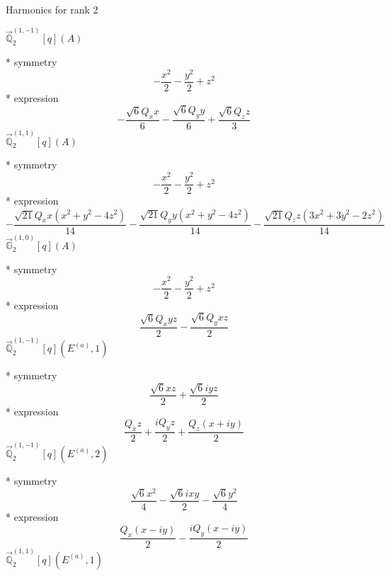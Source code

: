 \documentclass[fleqn,8pt]{jsarticle}
\begin{document}
\noindent * Harmonics for rank 2

\noindent\quad $\vec{\mathbb{Q}}_{2}^{(1,-1)}[q](A)$

\noindent\quad ** symmetry
\begin{dmath*}
- \frac{x^{2}}{2} - \frac{y^{2}}{2} + z^{2}
\end{dmath*}
\noindent\quad ** expression
\begin{dmath*}
- \frac{\sqrt{6} Q_{x} x}{6} - \frac{\sqrt{6} Q_{y} y}{6} + \frac{\sqrt{6} Q_{z} z}{3}
\end{dmath*}
\noindent\quad $\vec{\mathbb{Q}}_{2}^{(1,1)}[q](A)$

\noindent\quad ** symmetry
\begin{dmath*}
- \frac{x^{2}}{2} - \frac{y^{2}}{2} + z^{2}
\end{dmath*}
\noindent\quad ** expression
\begin{dmath*}
- \frac{\sqrt{21} Q_{x} x \left(x^{2} + y^{2} - 4 z^{2}\right)}{14} - \frac{\sqrt{21} Q_{y} y \left(x^{2} + y^{2} - 4 z^{2}\right)}{14} - \frac{\sqrt{21} Q_{z} z \left(3 x^{2} + 3 y^{2} - 2 z^{2}\right)}{14}
\end{dmath*}
\noindent\quad $\vec{\mathbb{G}}_{2}^{(1,0)}[q](A)$

\noindent\quad ** symmetry
\begin{dmath*}
- \frac{x^{2}}{2} - \frac{y^{2}}{2} + z^{2}
\end{dmath*}
\noindent\quad ** expression
\begin{dmath*}
\frac{\sqrt{6} Q_{x} y z}{2} - \frac{\sqrt{6} Q_{y} x z}{2}
\end{dmath*}
\noindent\quad $\vec{\mathbb{Q}}_{2}^{(1,-1)}[q](E^{(a)},1)$

\noindent\quad ** symmetry
\begin{dmath*}
\frac{\sqrt{6} x z}{2} + \frac{\sqrt{6} i y z}{2}
\end{dmath*}
\noindent\quad ** expression
\begin{dmath*}
\frac{Q_{x} z}{2} + \frac{i Q_{y} z}{2} + \frac{Q_{z} \left(x + i y\right)}{2}
\end{dmath*}
\noindent\quad $\vec{\mathbb{Q}}_{2}^{(1,-1)}[q](E^{(a)},2)$

\noindent\quad ** symmetry
\begin{dmath*}
\frac{\sqrt{6} x^{2}}{4} - \frac{\sqrt{6} i x y}{2} - \frac{\sqrt{6} y^{2}}{4}
\end{dmath*}
\noindent\quad ** expression
\begin{dmath*}
\frac{Q_{x} \left(x - i y\right)}{2} - \frac{i Q_{y} \left(x - i y\right)}{2}
\end{dmath*}
\noindent\quad $\vec{\mathbb{Q}}_{2}^{(1,1)}[q](E^{(a)},1)$
\end{document}

